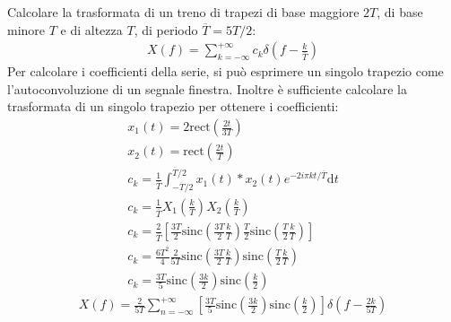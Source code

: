 \documentclass{article}
\newcommand{\rect}{\mathrm{rect}}
\newcommand{\sinc}{\mathrm{sinc}}
\newcommand{\df}{\mathrm{d}}
\begin{document}
Calcolare la trasformata di un treno di trapezi di base maggiore $2T$, di base minore $T$ e di altezza $T$, di periodo $\overline T=5T/2$:
\begin{gather*}
    X(f)=\displaystyle\sum_{k=-\infty}^{+\infty}c_k\delta\left(f-\frac{k}{\overline T}\right)
\end{gather*}
Per calcolare i coefficienti della serie, si può esprimere un singolo trapezio come l'autoconvoluzione di un segnale finestra. Inoltre è sufficiente calcolare la 
trasformata di un singolo trapezio per ottenere i coefficienti:
\begin{gather*}
    x_1(t)=2\displaystyle\rect\left(\frac{2t}{3T}\right)\\
    x_2(t)=\displaystyle\rect\left(\frac{2t}{T}\right)\\
    c_k=\displaystyle\frac{1}{\overline T}\int_{-\overline T/2}^{\overline T/2}x_1(t)*x_2(t)e^{-2i\pi kt/\overline T}\df t\\
    c_k=\displaystyle\frac{1}{\overline T}X_1\left(\frac{k}{ T}\right)X_2\left(\frac{k}{ T}\right)\\
    c_k=\displaystyle\frac{2}{\overline T}\left[\frac{3T}{2}\sinc\left(\frac{3T}{2}\frac{k}{ T}\right)\frac{T}{2}\sinc\left(\frac{T}{2}\frac{k}{ T}\right)\right]\\
    c_k=\displaystyle\frac{6T^2}{4}\frac{2}{5T}\sinc\left(\frac{3T}{2}\frac{k}{ T}\right)\sinc\left(\frac{T}{2}\frac{k}{ T}\right)\\
    c_k=\displaystyle\frac{3T}{5}\sinc\left(\frac{3k}{2}\right)\sinc\left(\frac{k}{2}\right)
\end{gather*}
\begin{gather}
    X(f)=\displaystyle\frac{2}{5T}\sum_{n=-\infty}^{+\infty}\left[\frac{3T}{5}\sinc\left(\frac{3k}{2}\right)\sinc\left(\frac{k}{2}\right)\right]\delta\left(f-\frac{2k}{5T}\right)
\end{gather}
\end{document}
